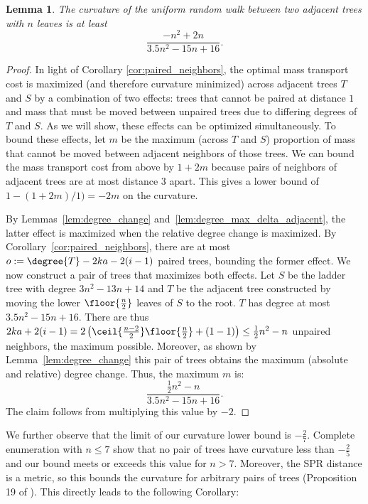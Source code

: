 \documentclass{amsart}
\newtheorem{lemma}[theorem]{Lemma}
\begin{document}
\begin{lemma}
	The curvature of the uniform random walk between two adjacent trees with $n$ leaves is at least
	$$\frac{-n^2 + 2n}{3.5n^2 - 15n + 16}.$$
\end{lemma}
\begin{proof}
    In light of Corollary \ref{cor:paired_neighbors}, the optimal mass transport cost is maximized (and therefore curvature minimized) across adjacent trees $T$ and $S$ by a combination of two effects: trees that cannot be paired at distance $1$ and mass that must be moved between unpaired trees due to differing degrees of $T$ and $S$.
		As we will show, these effects can be optimized simultaneously.
    To bound these effects, let $m$ be the maximum (across $T$ and $S$) proportion of mass that cannot be moved between adjacent neighbors of those trees.
    We can bound the mass transport cost from above by $1 + 2m$ because pairs of neighbors of adjacent trees are at most distance 3 apart.
	This gives a lower bound of $1 - (1 + 2m) / 1) = -2m$ on the curvature.

	By Lemmas~\ref{lem:degree_change} and~\ref{lem:degree_max_delta_adjacent}, the latter effect is maximized when the relative degree change is maximized.
	By Corollary~\ref{cor:paired_neighbors}, there are at most $o := \degree{T} -2ka - 2(i-1)$ paired trees, bounding the former effect.
	We now construct a pair of trees that maximizes both effects.
	Let $S$ be the ladder tree with degree $3n^2 - 13n + 14$ and $T$ be the adjacent tree constructed by moving the lower $\floor{\frac{n}{2}}$ leaves of $S$ to the root.
	$T$ has degree at most $3.5n^2 -15n + 16$.
	There are thus $2ka + 2(i-1) = 2\left(\ceil{\frac{n-2}{2}}\floor{\frac{n}{2}} +(1-1)\right) \le \frac{1}{2}n^2 - n$ unpaired neighbors, the maximum possible.
	Moreover, as shown by Lemma~\ref{lem:degree_change} this pair of trees obtains the maximum (absolute and relative) degree change.
	Thus, the maximum $m$ is:
	$$\frac{\frac{1}{2}n^2 - n}{3.5n^2 - 15n + 16}.$$
	The claim follows from multiplying this value by $-2$.
\end{proof}

We further observe that the limit of our curvature lower bound is $-\frac{2}{7}$.
Complete enumeration with $n \le 7$ show that no pair of trees have curvature less than $-\frac{2}{5}$ and our bound meets or exceeds this value for $n > 7$.
Moreover, the SPR distance is a metric, so this bounds the curvature for arbitrary pairs of trees (Proposition 19 of \cite{Ollivier2009-bw}).
This directly leads to the following Corollary:
\end{document}
